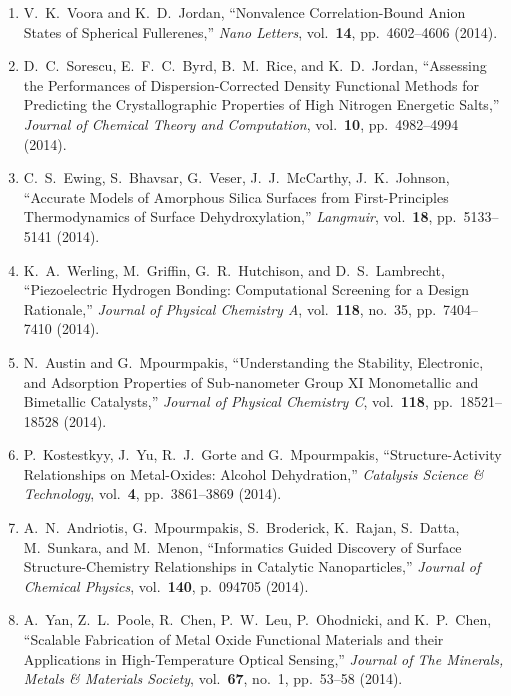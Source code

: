 \begin{enumerate}
\item V.\ K.\ Voora and K.\ D.\ Jordan, ``Nonvalence Correlation-Bound
  Anion States of Spherical Fullerenes,'' \textit{Nano Letters},
  vol.\ \textbf{14}, pp.\ 4602--4606 (2014).

\item D.\ C.\ Sorescu, E.\ F.\ C.\ Byrd, B.\ M.\ Rice, and
  K.\ D.\ Jordan, ``Assessing the Performances of Dispersion-Corrected
  Density Functional Methods for Predicting the Crystallographic
  Properties of High Nitrogen Energetic Salts,'' \textit{Journal of
    Chemical Theory and Computation}, vol.\ \textbf{10},
  pp.\ 4982--4994 (2014).

\item C.\ S.\ Ewing, S.\ Bhavsar, G.\ Veser, J.\ J.\ McCarthy,
  J.\ K.\ Johnson, ``Accurate Models of Amorphous Silica Surfaces from
  First-Principles Thermodynamics of Surface Dehydroxylation,''
  \textit{Langmuir}, vol.\ \textbf{18}, pp.\ 5133--5141 (2014).

\item K.\ A.\ Werling, M.\ Griffin, G.\ R.\ Hutchison, and
  D.\ S.\ Lambrecht, ``Piezoelectric Hydrogen Bonding: Computational
  Screening for a Design Rationale,'' \textit{Journal of Physical
    Chemistry A}, vol.\ \textbf{118}, no.\ 35, pp.\ 7404--7410 (2014).

\item N.\ Austin and G.\ Mpourmpakis, ``Understanding the Stability,
  Electronic, and Adsorption Properties of Sub-nanometer Group XI
  Monometallic and Bimetallic Catalysts,'' \textit{Journal of Physical
    Chemistry C}, vol.\ \textbf{118}, pp.\ 18521--18528 (2014).

\item P.\ Kostestkyy, J.\ Yu, R.\ J.\ Gorte and G.\ Mpourmpakis,
  ``Structure-Activity Relationships on Metal-Oxides: Alcohol
  Dehydration,'' \textit{Catalysis Science \& Technology},
  vol.\ \textbf{4}, pp.\ 3861--3869 (2014).

\item A.\ N.\ Andriotis, G.\ Mpourmpakis, S.\ Broderick, K.\ Rajan,
  S.\ Datta, M.\ Sunkara, and M.\ Menon, ``Informatics Guided
  Discovery of Surface Structure-Chemistry Relationships in Catalytic
  Nanoparticles,'' \textit{Journal of Chemical Physics},
  vol.\ \textbf{140}, p.\ 094705 (2014).

\item A.\ Yan, Z.\ L.\ Poole, R.\ Chen, P.\ W.\ Leu, P.\ Ohodnicki,
  and K.\ P.\ Chen, ``Scalable Fabrication of Metal Oxide Functional
  Materials and their Applications in High-Temperature Optical
  Sensing,'' \textit{Journal of The Minerals, Metals \& Materials
    Society}, vol.\ \textbf{67}, no.\ 1, pp.\ 53--58 (2014).


\end{enumerate}
